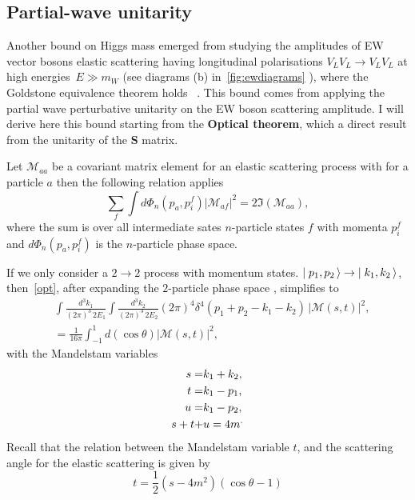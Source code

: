 \subsection{Partial-wave unitarity \label{pwusection}}
Another bound on Higgs mass emerged from studying the amplitudes of EW vector bosons elastic scattering having longitudinal polarisations $V_L V_L \to V_L V_L$ at high energies~$ E \gg m_W$ (see diagrams (b) in~\autoref{fig:ewdiagrams} ), where the Goldstone equivalence theorem holds ~\cite{PhysRevD.42.853}. 
This bound comes from applying the partial wave perturbative unitarity on the EW boson scattering amplitude. I will derive here this bound starting from the \textbf{Optical theorem}, which a direct result from the unitarity of the $\mathbf S$ matrix.
\begin{tcolorbox}[title=The optical theorem,
	title filled=false,
	colback=Mahogany!5!white,
	colframe=Mahogany]
	Let $\mathcal M_{aa}$ be a covariant matrix element for an elastic  scattering process with for a particle $a$  then the following relation applies
	\begin{equation}
		\sum_{f}  \int d\Phi_n(p_a,p_i^f)| \mathcal M_{af}|^2 = 2 \mathfrak{I}( \mathcal M_{aa}),
		\label{opt}
	\end{equation}
	where the sum is over all intermediate sates $n$-particle states $f$ with momenta $p_i^f$ and $d\Phi_n(p_a,p_i^f)$ is the $n$-particle phase space.
\end{tcolorbox}
If we only consider a $2 \to 2$ process with momentum states. $\mbox{$\mid p_1,p_2\,\rangle$} \to \mbox{$\mid k_1,k_2\,\rangle$}$, then~\eqref{opt}, after expanding the $2$-particle phase space ,
simplifies to 
\begin{align}
	&\int  \frac{d^3k_1}{(2 \pi)^3\,2E_1} \int  \frac{d^3k_2}{(2 \pi)^3\,2E_2} (2 \pi)^4 \delta^4(p_1+p_2-k_1-k_2)\,| \mathcal M (s,t)|^2 ,\nonumber \\
	&= \frac{1}{16 \pi} \int_{-1}^{1} d(\cos \theta) | \mathcal M (s,t)|^2,
\end{align}
with the Mandelstam variables 
\begin{align}
	s = &k_1+k_2, \nonumber \\
	t =& k_1-p_1, \nonumber \\
	u=& k_1-p_2, \\
	s+t+&u = 4 m^. \nonumber
\end{align}
Recall that the relation between the Mandelstam variable $t$, and the scattering angle for the elastic scattering is given by
\begin{equation}
	t = \frac{1}{2} (s-4 m^2)(\cos \theta-1)
\end{equation}
